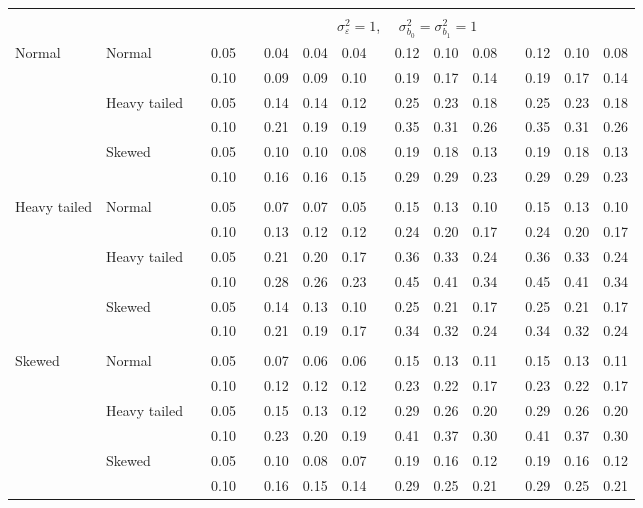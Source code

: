 \documentclass[11pt]{article} %
\begin{document}
\begin{table}[ht]
\begin{scriptsize}
\begin{center}
\begin{tabular}{ll p{.1cm} c p{.1cm} rrr p{.1cm} rrr p{.1cm} rrr}
&&&&&&&&&&&&&&&\\
& && && \multicolumn{9}{c}{$\sigma_{\varepsilon}^2 = 1$, \ \ $\sigma_{b_0}^2 = \sigma_{b_1}^2 = 1$} \\ \cline{6-16}
Normal       & Normal       && 0.05 &&  0.04 & 0.04 & 0.04 && 0.12 & 0.10 & 0.08 && 0.12 & 0.10 & 0.08 \\ 
             &              && 0.10 &&  0.09 & 0.09 & 0.10 && 0.19 & 0.17 & 0.14 && 0.19 & 0.17 & 0.14 \\ 
             & Heavy tailed && 0.05 &&  0.14 & 0.14 & 0.12 && 0.25 & 0.23 & 0.18 && 0.25 & 0.23 & 0.18 \\ 
             &              && 0.10 &&  0.21 & 0.19 & 0.19 && 0.35 & 0.31 & 0.26 && 0.35 & 0.31 & 0.26 \\ 
             & Skewed       && 0.05 &&  0.10 & 0.10 & 0.08 && 0.19 & 0.18 & 0.13 && 0.19 & 0.18 & 0.13 \\ 
             &              && 0.10 &&  0.16 & 0.16 & 0.15 && 0.29 & 0.29 & 0.23 && 0.29 & 0.29 & 0.23 \\ 
             &&&&&&&&&&&&&&&\\
Heavy tailed & Normal       && 0.05 &&  0.07 & 0.07 & 0.05 && 0.15 & 0.13 & 0.10 && 0.15 & 0.13 & 0.10 \\ 
             &              && 0.10 &&  0.13 & 0.12 & 0.12 && 0.24 & 0.20 & 0.17 && 0.24 & 0.20 & 0.17 \\ 
             & Heavy tailed && 0.05 &&  0.21 & 0.20 & 0.17 && 0.36 & 0.33 & 0.24 && 0.36 & 0.33 & 0.24 \\ 
             &              && 0.10 &&  0.28 & 0.26 & 0.23 && 0.45 & 0.41 & 0.34 && 0.45 & 0.41 & 0.34 \\ 
             & Skewed       && 0.05 &&  0.14 & 0.13 & 0.10 && 0.25 & 0.21 & 0.17 && 0.25 & 0.21 & 0.17 \\ 
             &              && 0.10 &&  0.21 & 0.19 & 0.17 && 0.34 & 0.32 & 0.24 && 0.34 & 0.32 & 0.24 \\ 
             &&&&&&&&&&&&&&&\\
Skewed       & Normal       && 0.05 &&  0.07 & 0.06 & 0.06 && 0.15 & 0.13 & 0.11 && 0.15 & 0.13 & 0.11 \\ 
             &              && 0.10 &&  0.12 & 0.12 & 0.12 && 0.23 & 0.22 & 0.17 && 0.23 & 0.22 & 0.17 \\ 
             & Heavy tailed && 0.05 &&  0.15 & 0.13 & 0.12 && 0.29 & 0.26 & 0.20 && 0.29 & 0.26 & 0.20 \\ 
             &              && 0.10 &&  0.23 & 0.20 & 0.19 && 0.41 & 0.37 & 0.30 && 0.41 & 0.37 & 0.30 \\ 
             & Skewed       && 0.05 &&  0.10 & 0.08 & 0.07 && 0.19 & 0.16 & 0.12 && 0.19 & 0.16 & 0.12 \\ 
             &              && 0.10 &&  0.16 & 0.15 & 0.14 && 0.29 & 0.25 & 0.21 && 0.29 & 0.25 & 0.21 \\ 



\end{tabular}
\end{center}
\end{scriptsize}
\end{table}
\end{document}
